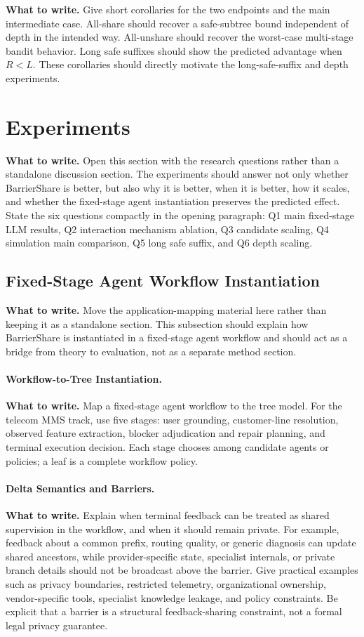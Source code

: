 \documentclass{article}
\newcommand{\towrite}[1]{\noindent\textbf{What to write.} #1}
\begin{document}
\towrite{Give short corollaries for the two endpoints and the main intermediate case. All-share should recover a safe-subtree bound independent of depth in the intended way. All-unshare should recover the worst-case multi-stage bandit behavior. Long safe suffixes should show the predicted advantage when $R<L$. These corollaries should directly motivate the long-safe-suffix and depth experiments.}

\section{Experiments}

\towrite{Open this section with the research questions rather than a standalone discussion section. The experiments should answer not only whether BarrierShare is better, but also why it is better, when it is better, how it scales, and whether the fixed-stage agent instantiation preserves the predicted effect. State the six questions compactly in the opening paragraph: Q1 main fixed-stage LLM results, Q2 interaction mechanism ablation, Q3 candidate scaling, Q4 simulation main comparison, Q5 long safe suffix, and Q6 depth scaling.}

\subsection{Fixed-Stage Agent Workflow Instantiation}

\towrite{Move the application-mapping material here rather than keeping it as a standalone section. This subsection should explain how BarrierShare is instantiated in a fixed-stage agent workflow and should act as a bridge from theory to evaluation, not as a separate method section.}

\paragraph{Workflow-to-Tree Instantiation.}
\towrite{Map a fixed-stage agent workflow to the tree model. For the telecom MMS track, use five stages: user grounding, customer-line resolution, observed feature extraction, blocker adjudication and repair planning, and terminal execution decision. Each stage chooses among candidate agents or policies; a leaf is a complete workflow policy.}

\paragraph{Delta Semantics and Barriers.}
\towrite{Explain when terminal feedback can be treated as shared supervision in the workflow, and when it should remain private. For example, feedback about a common prefix, routing quality, or generic diagnosis can update shared ancestors, while provider-specific state, specialist internals, or private branch details should not be broadcast above the barrier. Give practical examples such as privacy boundaries, restricted telemetry, organizational ownership, vendor-specific tools, specialist knowledge leakage, and policy constraints. Be explicit that a barrier is a structural feedback-sharing constraint, not a formal legal privacy guarantee.}
\end{document}
